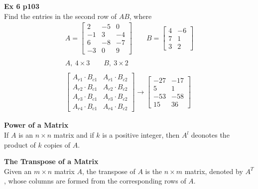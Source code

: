\documentclass{article}
\begin{document}
    \textbf{Ex 6 p103}\\
    Find the entries in the second row of $ AB $, where
    \[
      \begin{gathered}
      A= \begin{bmatrix}
        2 &-5 &0\\
        -1 &3 &-4\\
        6 &-8 &-7\\
        -3 &0 &9
      \end{bmatrix}\qquad
      B=\begin{bmatrix}
        4 &-6\\
        7 &1\\
        3 &2
      \end{bmatrix}\\
      ~\\
      A,~4 \times 3 \qquad B,~3 \times 2\\
      ~\\
      \begin{bmatrix}
        A_{r1} \cdot B_{c1} &A_{r1} \cdot B_{c2}\\
        A_{r2} \cdot B_{c1} &A_{r2} \cdot B_{c2}\\
        A_{r3} \cdot B_{c1} &A_{r3} \cdot B_{c2}\\
        A_{r4} \cdot B_{c1} &A_{r4} \cdot B_{c2}                
      \end{bmatrix} \to
      \begin{bmatrix}
        -27 &-17\\
        5 &1\\
        -53 &-58\\
        15 &36
      \end{bmatrix}
      \end{gathered}
    \]

    \textbf{Power of a Matrix}\\
    If $ A $ is an $ n \times n $ matrix and if $ k $ is a positive integer, then $ A^{l} $ deonotes the product of $ k $ copies of $ A $.
    
    \textbf{The Transpose of a Matrix}\\
    Given an $ m \times n $ matrix $ A $, the transpose of $ A $ is the $ n \times m $ matrix, denoted by $ A^{T}  $, whose columns are formed from the corresponding rows of $ A $.      
    
\end{document}
